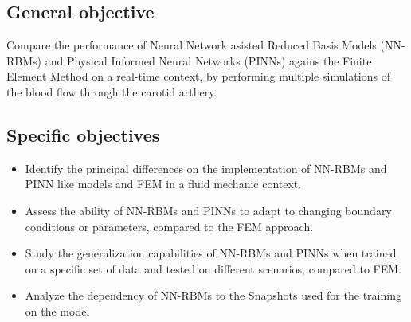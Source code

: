 \documentclass[12pt,letterpaper]{article}
\begin{document}
\subsection{General objective}

Compare the performance of Neural Network asisted Reduced Basis Models (NN-RBMs) and Physical Informed Neural Networks (PINNs)
agains the Finite Element Method on a real-time context, by performing multiple simulations 
of the blood flow through the carotid arthery.

\subsection{Specific objectives}

\begin{itemize}
  \item Identify the principal differences on the implementation of NN-RBMs and PINN like models and FEM in a fluid mechanic context.
  \item Assess the ability of NN-RBMs and PINNs to adapt to changing boundary conditions or parameters, compared to the FEM approach.
  \item  Study the generalization capabilities of NN-RBMs and PINNs when trained on a specific set of data and tested on different scenarios, compared to FEM.
  \item Analyze the dependency of NN-RBMs to the Snapshots used for the training on the model
\end{itemize}
\end{document}
